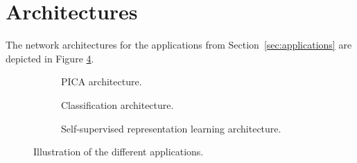 \section{Architectures}

The network architectures for the applications from Section~\ref{sec:applications} are depicted in Figure \ref{fig:admin_applications_archs}. 

\begin{figure} %
    \begin{subfigure}{0.99\columnwidth}
        \centering
        \def\svgwidth{0.68\columnwidth}
        {\scriptsize }
        \caption{PICA architecture.}
        \label{subfig:pica_arch_illustr}
        \vspace{20px}
    \end{subfigure}
    \begin{subfigure}{0.99\columnwidth}
        \centering
        \def\svgwidth{0.71\columnwidth}
        {\scriptsize }
        \caption{Classification architecture.}
        \label{subfig:cls_arch_illustr}
        \vspace{20px}
    \end{subfigure}
    \begin{subfigure}{0.99\columnwidth}
        \centering
        \def\svgwidth{0.8\columnwidth}
        {\scriptsize }
        \caption{Self-supervised representation learning architecture.}
        \label{subfig:ssl_arch_illustr}
    \end{subfigure}
    \caption{Illustration of the different applications.}
    \label{fig:admin_applications_archs}
\end{figure} 

